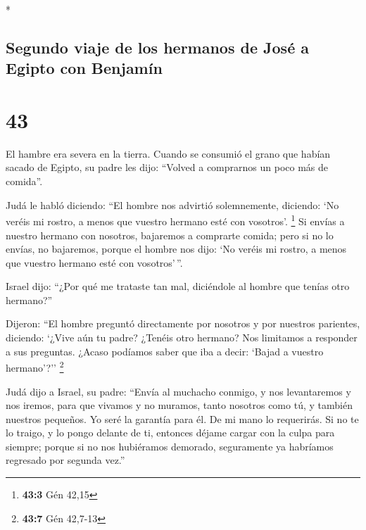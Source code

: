 \begin{paracol}{2}
\begin{otherlanguage}{english}
\end{otherlanguage}

\switchcolumn[0]*

\hypertarget{segundo-viaje-de-los-hermanos-de-josuxe9-a-egipto-con-benjamuxedn}{%
\subsection{Segundo viaje de los hermanos de José a Egipto con
Benjamín}\label{segundo-viaje-de-los-hermanos-de-josuxe9-a-egipto-con-benjamuxedn}}

\hypertarget{section-84}{%
\section{43}\label{section-84}}

 El hambre era severa en la tierra.  Cuando
se consumió el grano que habían sacado de Egipto, su padre les dijo:
``Volved a comprarnos un poco más de comida''.

 Judá le habló diciendo: ``El hombre nos advirtió
solemnemente, diciendo: `No veréis mi rostro, a menos que vuestro
hermano esté con vosotros'. \footnote{\textbf{43:3} Gén 42,15}
 Si envías a nuestro hermano con nosotros, bajaremos a
comprarte comida;  pero si no lo envías, no bajaremos,
porque el hombre nos dijo: `No veréis mi rostro, a menos que vuestro
hermano esté con vosotros'\,''.

 Israel dijo: ``¿Por qué me trataste tan mal, diciéndole
al hombre que tenías otro hermano?''

 Dijeron: ``El hombre preguntó directamente por nosotros y
por nuestros parientes, diciendo: `¿Vive aún tu padre? ¿Tenéis otro
hermano? Nos limitamos a responder a sus preguntas. ¿Acaso podíamos
saber que iba a decir: `Bajad a vuestro hermano'?'' \footnote{\textbf{43:7}
  Gén 42,7-13}

 Judá dijo a Israel, su padre: ``Envía al muchacho
conmigo, y nos levantaremos y nos iremos, para que vivamos y no muramos,
tanto nosotros como tú, y también nuestros pequeños.  Yo
seré la garantía para él. De mi mano lo requerirás. Si no te lo traigo,
y lo pongo delante de ti, entonces déjame cargar con la culpa para
siempre;  porque si no nos hubiéramos demorado,
seguramente ya habríamos regresado por segunda vez.''


\end{paracol}
